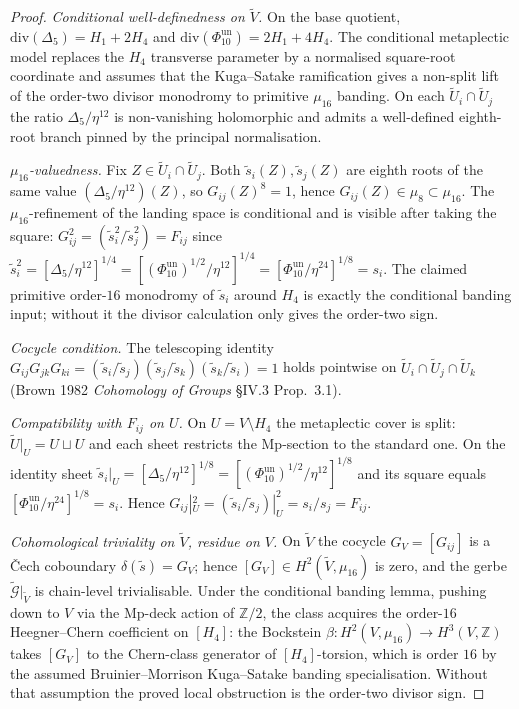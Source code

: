 \begin{proof}
\emph{Conditional well-definedness on $\widetilde V$.} On the base
quotient, $\mathrm{div}(\Delta_5)=H_1+2H_4$ and
$\mathrm{div}(\Phi_{10}^{\mathrm{un}})=2H_1+4H_4$. The conditional
metaplectic model replaces the $H_4$ transverse parameter by a
normalised square-root coordinate and assumes that the Kuga--Satake
ramification gives a non-split lift of the order-two divisor monodromy
to primitive $\mu_{16}$ banding. On each
$\widetilde U_i\cap\widetilde U_j$
the ratio $\Delta_5/\eta^{12}$ is non-vanishing holomorphic and admits
a well-defined eighth-root branch pinned by the principal normalisation.

\emph{$\mu_{16}$-valuedness.} Fix $Z\in\widetilde U_i\cap\widetilde U_j$.
Both $\widetilde s_i(Z),\widetilde s_j(Z)$ are eighth roots of the
same value $(\Delta_5/\eta^{12})(Z)$, so
$G_{ij}(Z)^8 = 1$, hence $G_{ij}(Z)\in\mu_8\subset\mu_{16}$. The
$\mu_{16}$-refinement of the landing space is conditional and is visible after taking the
square: $G_{ij}^2 = (\widetilde s_i^2/\widetilde s_j^2) = F_{ij}$ since
$\widetilde s_i^2 = [\Delta_5/\eta^{12}]^{1/4} =
[(\Phi_{10}^{\mathrm{un}})^{1/2}/\eta^{12}]^{1/4}
= [\Phi_{10}^{\mathrm{un}}/\eta^{24}]^{1/8} = s_i$. The claimed
primitive order-$16$ monodromy of $\widetilde s_i$ around $H_4$ is
exactly the conditional banding input; without it the divisor calculation
only gives the order-two sign.

\emph{Cocycle condition.} The telescoping identity
$G_{ij}G_{jk}G_{ki}
= (\widetilde s_i/\widetilde s_j)(\widetilde s_j/\widetilde s_k)(\widetilde s_k/\widetilde s_i) = 1$
holds pointwise on $\widetilde U_i\cap\widetilde U_j\cap\widetilde U_k$
(Brown 1982 \emph{Cohomology of Groups} \S IV.3 Prop.~3.1).

\emph{Compatibility with $F_{ij}$ on $U$.} On $U = V\setminus H_4$ the
metaplectic cover is split: $\widetilde U|_U = U\sqcup U$ and each sheet
restricts the Mp-section to the standard one. On the identity sheet
$\widetilde s_i|_U = [\Delta_5/\eta^{12}]^{1/8}
= [(\Phi_{10}^{\mathrm{un}})^{1/2}/\eta^{12}]^{1/8}$
and its square equals
$[\Phi_{10}^{\mathrm{un}}/\eta^{24}]^{1/8} = s_i$. Hence
$G_{ij}|_U^2 = (\widetilde s_i/\widetilde s_j)|_U^2 = s_i/s_j = F_{ij}$.

\emph{Cohomological triviality on $\widetilde V$, residue on $V$.} On
$\widetilde V$ the cocycle $G_V = [G_{ij}]$ is a \v Cech coboundary
$\delta(\widetilde s) = G_V$; hence
$[G_V]\in H^2(\widetilde V,\mu_{16})$ is zero, and the gerbe
$\widetilde{\mathcal G}|_{\widetilde V}$ is chain-level trivialisable.
Under the conditional banding lemma, pushing down to $V$ via the Mp-deck
action of $\mathbb Z/2$, the class acquires the order-$16$
Heegner--Chern coefficient on $[H_4]$:
the Bockstein $\beta\colon H^2(V,\mu_{16})\to H^3(V,\mathbb Z)$
takes $[G_V]$ to the Chern-class generator of $[H_4]$-torsion, which
is order $16$ by the assumed Bruinier--Morrison Kuga--Satake banding
specialisation. Without that assumption the proved local obstruction is
the order-two divisor sign.


\end{proof}
